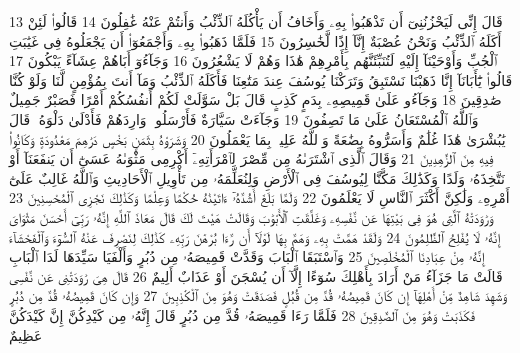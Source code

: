 {\tiny\colorbox{cl_aya}{13}} قَالَ إِنِّى لَيَحْزُنُنِىٓ أَن تَذْهَبُوا۟ بِهِۦ وَأَخَافُ أَن يَأْكُلَهُ ٱلذِّئْبُ وَأَنتُمْ عَنْهُ غَٰفِلُونَ
{\tiny\colorbox{cl_aya}{14}} قَالُوا۟ لَئِنْ أَكَلَهُ ٱلذِّئْبُ وَنَحْنُ عُصْبَةٌ إِنَّآ إِذًا لَّخَٰسِرُونَ
{\tiny\colorbox{cl_aya}{15}} فَلَمَّا ذَهَبُوا۟ بِهِۦ وَأَجْمَعُوٓا۟ أَن يَجْعَلُوهُ فِى غَيَٰبَتِ ٱلْجُبِّ وَأَوْحَيْنَآ إِلَيْهِ لَتُنَبِّئَنَّهُم بِأَمْرِهِمْ هَٰذَا وَهُمْ لَا يَشْعُرُونَ
{\tiny\colorbox{cl_aya}{16}} وَجَآءُوٓ أَبَاهُمْ عِشَآءً يَبْكُونَ
{\tiny\colorbox{cl_aya}{17}} قَالُوا۟ يَٰٓأَبَانَآ إِنَّا ذَهَبْنَا نَسْتَبِقُ وَتَرَكْنَا يُوسُفَ عِندَ مَتَٰعِنَا فَأَكَلَهُ ٱلذِّئْبُ وَمَآ أَنتَ بِمُؤْمِنٍ لَّنَا وَلَوْ كُنَّا صَٰدِقِينَ
{\tiny\colorbox{cl_aya}{18}} وَجَآءُو عَلَىٰ قَمِيصِهِۦ بِدَمٍ كَذِبٍ قَالَ بَلْ سَوَّلَتْ لَكُمْ أَنفُسُكُمْ أَمْرًا فَصَبْرٌ جَمِيلٌ وَٱللَّهُ ٱلْمُسْتَعَانُ عَلَىٰ مَا تَصِفُونَ
{\tiny\colorbox{cl_aya}{19}} وَجَآءَتْ سَيَّارَةٌ فَأَرْسَلُوا۟ وَارِدَهُمْ فَأَدْلَىٰ دَلْوَهُۥ قَالَ يَٰبُشْرَىٰ هَٰذَا غُلَٰمٌ وَأَسَرُّوهُ بِضَٰعَةً وَٱللَّهُ عَلِيمٌۢ بِمَا يَعْمَلُونَ
{\tiny\colorbox{cl_aya}{20}} وَشَرَوْهُ بِثَمَنٍۭ بَخْسٍ دَرَٰهِمَ مَعْدُودَةٍ وَكَانُوا۟ فِيهِ مِنَ ٱلزَّٰهِدِينَ
{\tiny\colorbox{cl_aya}{21}} وَقَالَ ٱلَّذِى ٱشْتَرَىٰهُ مِن مِّصْرَ لِٱمْرَأَتِهِۦٓ أَكْرِمِى مَثْوَىٰهُ عَسَىٰٓ أَن يَنفَعَنَآ أَوْ نَتَّخِذَهُۥ وَلَدًا وَكَذَٰلِكَ مَكَّنَّا لِيُوسُفَ فِى ٱلْأَرْضِ وَلِنُعَلِّمَهُۥ مِن تَأْوِيلِ ٱلْأَحَادِيثِ وَٱللَّهُ غَالِبٌ عَلَىٰٓ أَمْرِهِۦ وَلَٰكِنَّ أَكْثَرَ ٱلنَّاسِ لَا يَعْلَمُونَ
{\tiny\colorbox{cl_aya}{22}} وَلَمَّا بَلَغَ أَشُدَّهُۥٓ ءَاتَيْنَٰهُ حُكْمًا وَعِلْمًا وَكَذَٰلِكَ نَجْزِى ٱلْمُحْسِنِينَ
{\tiny\colorbox{cl_aya}{23}} وَرَٰوَدَتْهُ ٱلَّتِى هُوَ فِى بَيْتِهَا عَن نَّفْسِهِۦ وَغَلَّقَتِ ٱلْأَبْوَٰبَ وَقَالَتْ هَيْتَ لَكَ قَالَ مَعَاذَ ٱللَّهِ إِنَّهُۥ رَبِّىٓ أَحْسَنَ مَثْوَاىَ إِنَّهُۥ لَا يُفْلِحُ ٱلظَّٰلِمُونَ
{\tiny\colorbox{cl_aya}{24}} وَلَقَدْ هَمَّتْ بِهِۦ وَهَمَّ بِهَا لَوْلَآ أَن رَّءَا بُرْهَٰنَ رَبِّهِۦ كَذَٰلِكَ لِنَصْرِفَ عَنْهُ ٱلسُّوٓءَ وَٱلْفَحْشَآءَ إِنَّهُۥ مِنْ عِبَادِنَا ٱلْمُخْلَصِينَ
{\tiny\colorbox{cl_aya}{25}} وَٱسْتَبَقَا ٱلْبَابَ وَقَدَّتْ قَمِيصَهُۥ مِن دُبُرٍ وَأَلْفَيَا سَيِّدَهَا لَدَا ٱلْبَابِ قَالَتْ مَا جَزَآءُ مَنْ أَرَادَ بِأَهْلِكَ سُوٓءًا إِلَّآ أَن يُسْجَنَ أَوْ عَذَابٌ أَلِيمٌ
{\tiny\colorbox{cl_aya}{26}} قَالَ هِىَ رَٰوَدَتْنِى عَن نَّفْسِى وَشَهِدَ شَاهِدٌ مِّنْ أَهْلِهَآ إِن كَانَ قَمِيصُهُۥ قُدَّ مِن قُبُلٍ فَصَدَقَتْ وَهُوَ مِنَ ٱلْكَٰذِبِينَ
{\tiny\colorbox{cl_aya}{27}} وَإِن كَانَ قَمِيصُهُۥ قُدَّ مِن دُبُرٍ فَكَذَبَتْ وَهُوَ مِنَ ٱلصَّٰدِقِينَ
{\tiny\colorbox{cl_aya}{28}} فَلَمَّا رَءَا قَمِيصَهُۥ قُدَّ مِن دُبُرٍ قَالَ إِنَّهُۥ مِن كَيْدِكُنَّ إِنَّ كَيْدَكُنَّ عَظِيمٌ
